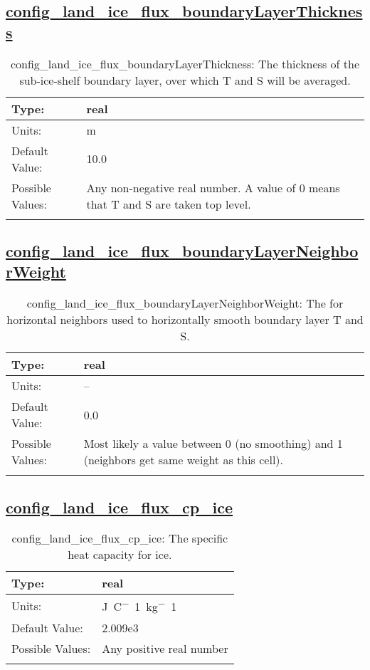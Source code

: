 \subsection[config\_land\_ice\_flux\_boundaryLayerThickness]{\hyperref[sec:nm_tab_land_ice_fluxes]{config\_land\_ice\_flux\_boundaryLayerThickness}}
\label{subsec:nm_sec_config_land_ice_flux_boundaryLayerThickness}
\begin{center}
\begin{longtable}{| p{2.0in} || p{4.0in} |}
    \hline
    Type: & real \\
    \hline
    Units: & \si{m} \\
    \hline
    Default Value: & 10.0 \\
    \hline
    Possible Values: & Any non-negative real number.  A value of 0 means that T and S are taken top level. \\
    \hline
    \caption{config\_land\_ice\_flux\_boundaryLayerThickness: The thickness of the sub-ice-shelf boundary layer, over which T and S will be averaged.}
\end{longtable}
\end{center}
\subsection[config\_land\_ice\_flux\_boundaryLayerNeighborWeight]{\hyperref[sec:nm_tab_land_ice_fluxes]{config\_land\_ice\_flux\_boundaryLayerNeighborWeight}}
\label{subsec:nm_sec_config_land_ice_flux_boundaryLayerNeighborWeight}
\begin{center}
\begin{longtable}{| p{2.0in} || p{4.0in} |}
    \hline
    Type: & real \\
    \hline
    Units: & -- \\
    \hline
    Default Value: & 0.0 \\
    \hline
    Possible Values: & Most likely a value between 0 (no smoothing) and 1 (neighbors get same weight as this cell). \\
    \hline
    \caption{config\_land\_ice\_flux\_boundaryLayerNeighborWeight: The for horizontal neighbors used to horizontally smooth boundary layer T and S.}
\end{longtable}
\end{center}
\subsection[config\_land\_ice\_flux\_cp\_ice]{\hyperref[sec:nm_tab_land_ice_fluxes]{config\_land\_ice\_flux\_cp\_ice}}
\label{subsec:nm_sec_config_land_ice_flux_cp_ice}
\begin{center}
\begin{longtable}{| p{2.0in} || p{4.0in} |}
    \hline
    Type: & real \\
    \hline
    Units: & \si{J.C^-1.kg^-1} \\
    \hline
    Default Value: & 2.009e3 \\
    \hline
    Possible Values: & Any positive real number \\
    \hline
    \caption{config\_land\_ice\_flux\_cp\_ice: The specific heat capacity for ice.}
\end{longtable}
\end{center}
